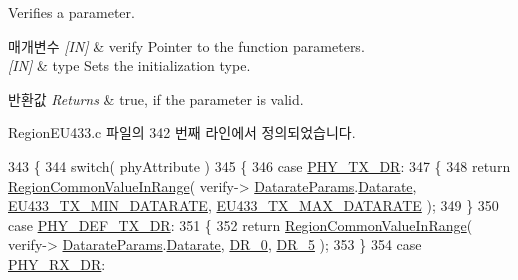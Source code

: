 Verifies a parameter. 


\begin{DoxyParams}{매개변수}
{\em \mbox{[}\+I\+N\mbox{]}} & verify Pointer to the function parameters.\\
\hline
{\em \mbox{[}\+I\+N\mbox{]}} & type Sets the initialization type.\\
\hline
\end{DoxyParams}

\begin{DoxyRetVals}{반환값}
{\em Returns} & true, if the parameter is valid. \\
\hline
\end{DoxyRetVals}


Region\+E\+U433.\+c 파일의 342 번째 라인에서 정의되었습니다.


\begin{DoxyCode}
343 \{
344     \textcolor{keywordflow}{switch}( phyAttribute )
345     \{
346         \textcolor{keywordflow}{case} \mbox{\hyperlink{group___r_e_g_i_o_n_gga51cbe8f5433d914fe9cf81b451de2c2da62c19af9dc2c54540562e1158c015f57}{PHY\_TX\_DR}}:
347         \{
348             \textcolor{keywordflow}{return} \mbox{\hyperlink{group___r_e_g_i_o_n_c_o_m_m_o_n_gafdd1c80d953e18d755a631b72a9c3bd3}{RegionCommonValueInRange}}( verify->
      \mbox{\hyperlink{unionu_verify_params_a92427be16343eb3d9c14334eb95ec058}{DatarateParams}}.\mbox{\hyperlink{structu_verify_params_1_1s_datarate_params_ae2f6080f3aa0e9485c55513ca56bb24d}{Datarate}}, \mbox{\hyperlink{group___r_e_g_i_o_n_e_u433_ga800fe5b0107ad06f0938c226022b436b}{EU433\_TX\_MIN\_DATARATE}}, 
      \mbox{\hyperlink{group___r_e_g_i_o_n_e_u433_gab53c26fec08fdd51e56cb0c4344f3fe9}{EU433\_TX\_MAX\_DATARATE}} );
349         \}
350         \textcolor{keywordflow}{case} \mbox{\hyperlink{group___r_e_g_i_o_n_gga51cbe8f5433d914fe9cf81b451de2c2da70c3923333165960549162e3dcf10467}{PHY\_DEF\_TX\_DR}}:
351         \{
352             \textcolor{keywordflow}{return} \mbox{\hyperlink{group___r_e_g_i_o_n_c_o_m_m_o_n_gafdd1c80d953e18d755a631b72a9c3bd3}{RegionCommonValueInRange}}( verify->
      \mbox{\hyperlink{unionu_verify_params_a92427be16343eb3d9c14334eb95ec058}{DatarateParams}}.\mbox{\hyperlink{structu_verify_params_1_1s_datarate_params_ae2f6080f3aa0e9485c55513ca56bb24d}{Datarate}}, \mbox{\hyperlink{group___r_e_g_i_o_n_ga6c4ef966b4f3d5eb7597b087f2b97095}{DR\_0}}, \mbox{\hyperlink{group___r_e_g_i_o_n_ga872e12c82020c02a7f70a1c6ed1375df}{DR\_5}} );
353         \}
354         \textcolor{keywordflow}{case} \mbox{\hyperlink{group___r_e_g_i_o_n_gga51cbe8f5433d914fe9cf81b451de2c2da8cc3b895173b07ee71127e366c8d0d55}{PHY\_RX\_DR}}:

\end{DoxyCode}
